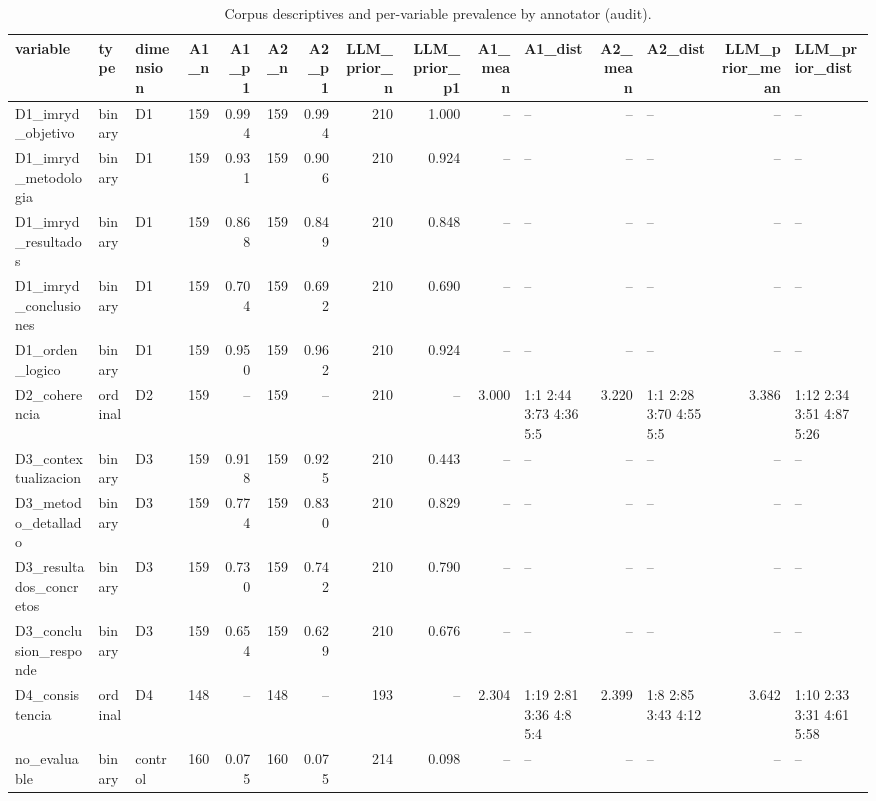 \begin{table}
\caption{Corpus descriptives and per-variable prevalence by annotator (audit).}
\label{tab:prevalence}
\begin{tabular}{lllrrrrrrrlrlrl}
\toprule
variable & type & dimension & A1\_n & A1\_p1 & A2\_n & A2\_p1 & LLM\_prior\_n & LLM\_prior\_p1 & A1\_mean & A1\_dist & A2\_mean & A2\_dist & LLM\_prior\_mean & LLM\_prior\_dist \\
\midrule
D1\_imryd\_objetivo & binary & D1 & 159 & 0.994 & 159 & 0.994 & 210 & 1.000 & -- & -- & -- & -- & -- & -- \\
D1\_imryd\_metodologia & binary & D1 & 159 & 0.931 & 159 & 0.906 & 210 & 0.924 & -- & -- & -- & -- & -- & -- \\
D1\_imryd\_resultados & binary & D1 & 159 & 0.868 & 159 & 0.849 & 210 & 0.848 & -- & -- & -- & -- & -- & -- \\
D1\_imryd\_conclusiones & binary & D1 & 159 & 0.704 & 159 & 0.692 & 210 & 0.690 & -- & -- & -- & -- & -- & -- \\
D1\_orden\_logico & binary & D1 & 159 & 0.950 & 159 & 0.962 & 210 & 0.924 & -- & -- & -- & -- & -- & -- \\
D2\_coherencia & ordinal & D2 & 159 & -- & 159 & -- & 210 & -- & 3.000 & 1:1 2:44 3:73 4:36 5:5 & 3.220 & 1:1 2:28 3:70 4:55 5:5 & 3.386 & 1:12 2:34 3:51 4:87 5:26 \\
D3\_contextualizacion & binary & D3 & 159 & 0.918 & 159 & 0.925 & 210 & 0.443 & -- & -- & -- & -- & -- & -- \\
D3\_metodo\_detallado & binary & D3 & 159 & 0.774 & 159 & 0.830 & 210 & 0.829 & -- & -- & -- & -- & -- & -- \\
D3\_resultados\_concretos & binary & D3 & 159 & 0.730 & 159 & 0.742 & 210 & 0.790 & -- & -- & -- & -- & -- & -- \\
D3\_conclusion\_responde & binary & D3 & 159 & 0.654 & 159 & 0.629 & 210 & 0.676 & -- & -- & -- & -- & -- & -- \\
D4\_consistencia & ordinal & D4 & 148 & -- & 148 & -- & 193 & -- & 2.304 & 1:19 2:81 3:36 4:8 5:4 & 2.399 & 1:8 2:85 3:43 4:12 & 3.642 & 1:10 2:33 3:31 4:61 5:58 \\
no\_evaluable & binary & control & 160 & 0.075 & 160 & 0.075 & 214 & 0.098 & -- & -- & -- & -- & -- & -- \\
\bottomrule
\end{tabular}
\end{table}
